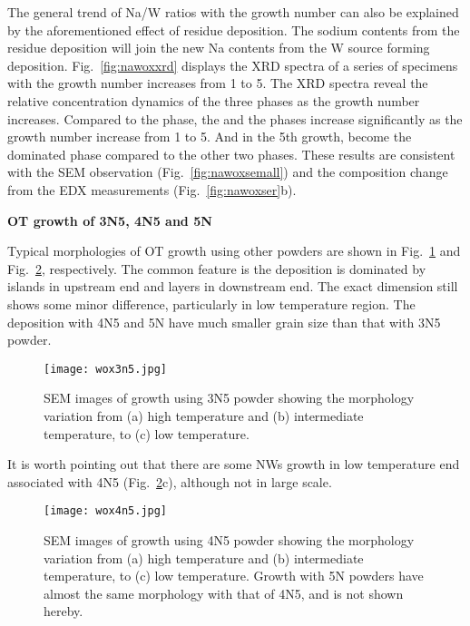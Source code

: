 The general trend of Na/W ratios with the growth number can also be explained by the aforementioned effect of residue deposition. The sodium contents from the residue deposition will join the new Na contents from the W source forming deposition. Fig.~\ref{fig:nawoxxrd} displays the XRD spectra of a series of specimens with the growth number increases from 1 to 5. The XRD spectra reveal the relative concentration dynamics of the three phases as the growth number increases. Compared to the  phase, the  and the  phases increase significantly as the growth number increase from 1 to 5. And in the 5th growth,  become the dominated phase compared to the other two phases. These results are consistent with the SEM observation (Fig.~\ref{fig:nawoxsemall}) and the composition change from the EDX measurements (Fig.~\ref{fig:nawoxser}b).


\textbf{OT growth of 3N5, 4N5 and 5N}

Typical morphologies of OT growth using other powders are shown in Fig.~\ref{fig:wox3n5} and Fig.~\ref{fig:wox4n5}, respectively. The common feature is the deposition is dominated by islands in upstream end and layers in downstream end. The exact dimension still shows some minor difference, particularly in low temperature region. The deposition with 4N5 and 5N have much smaller grain size than that with 3N5 powder.
\begin{figure}[htb]
\centering
\texttt{[image: wox3n5.jpg]}
\caption[SEM images of  growth using 3N5 powder]{SEM images of  growth using 3N5 powder showing the morphology variation from (a) high temperature and (b) intermediate temperature, to (c) low temperature.}
\label{fig:wox3n5}
\end{figure}
It is worth pointing out that there are some NWs growth in low temperature end associated with 4N5 (Fig.~\ref{fig:wox4n5}c), although not in large scale.
\begin{figure}[htb]
\centering
\texttt{[image: wox4n5.jpg]}
\caption[SEM images of  growth using 4N5 powder]{SEM images of  growth using 4N5 powder showing the morphology variation from (a) high temperature and (b) intermediate temperature, to (c) low temperature. Growth with 5N powders have almost the same morphology with that of 4N5, and is not shown hereby.}
\label{fig:wox4n5}
\end{figure}


